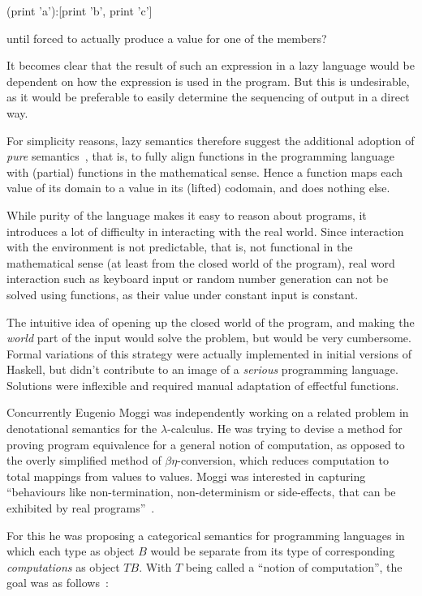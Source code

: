 \begin{code}
  (print 'a'):[print 'b', print 'c']
\end{code}

until forced to actually produce a value for one of the members?

It becomes clear that the result of such an expression in a lazy
language would be dependent on how the expression is used in the
program. But this is undesirable, as it would be preferable to easily
determine the sequencing of output in a direct way.

For simplicity reasons, lazy semantics therefore suggest the additional
adoption of \emph{pure} semantics~\cite[p. 12-8]{hask-history}, that is, to
fully align functions in the programming language with (partial) functions in
the mathematical sense.  Hence a function maps each value of its domain to a
value in its (lifted) codomain, and does nothing else.

While purity of the language makes it easy to reason about programs, it
introduces a lot of difficulty in interacting with the real world. Since
interaction with the environment is not predictable, that is, not
functional in the mathematical sense (at least from the closed world of
the program), real word interaction such as keyboard input or random
number generation can not be solved using functions, as their value
under constant input is constant.

The intuitive idea of opening up the closed world of the program, and
making the \emph{world} part of the input would solve the problem, but
would be very cumbersome. Formal variations of this strategy were
actually implemented in initial versions of Haskell, but didn't
contribute to an image of a \emph{serious} programming language.
Solutions were inflexible and required manual adaptation of effectful
functions.

Concurrently Eugenio Moggi was independently working on a related problem in
denotational semantics for the $\lambda$-calculus. He was trying to devise a
method for proving program equivalence for a general notion of computation, as
opposed to the overly simplified method of $\beta\eta$-conversion, which
reduces computation to total mappings from values to values. Moggi was
interested in capturing ``behaviours like non-termination, non-determinism or
side-effects, that can be exhibited by real programs''~\cite[p.
1]{moggi-89}.

For this he was proposing a categorical semantics for programming languages in
which each type as object $B$ would be separate from its type of corresponding
\emph{computations} as object $TB$. With $T$ being called a ``notion of
computation'', the goal was as follows~\cite[p. 2]{moggi-89}:

